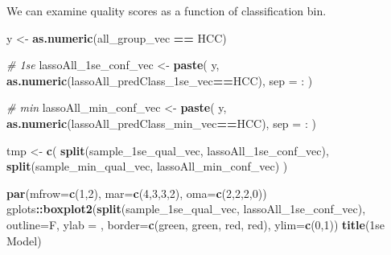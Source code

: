 \documentclass[
]{book}
\newenvironment{Shaded}{\begin{snugshade}}{\end{snugshade}}
\newcommand{\CommentTok}[1]{\textcolor[rgb]{0.56,0.35,0.01}{\textit{#1}}}
\newcommand{\DataTypeTok}[1]{\textcolor[rgb]{0.13,0.29,0.53}{#1}}
\newcommand{\DecValTok}[1]{\textcolor[rgb]{0.00,0.00,0.81}{#1}}
\newcommand{\KeywordTok}[1]{\textcolor[rgb]{0.13,0.29,0.53}{\textbf{#1}}}
\newcommand{\NormalTok}[1]{#1}
\newcommand{\OperatorTok}[1]{\textcolor[rgb]{0.81,0.36,0.00}{\textbf{#1}}}
\newcommand{\StringTok}[1]{\textcolor[rgb]{0.31,0.60,0.02}{#1}}
\begin{document}
We can examine quality scores as a function of classification bin.

\begin{Shaded}
\begin{Highlighting}[]
\NormalTok{y <{-}}\StringTok{ }\KeywordTok{as.numeric}\NormalTok{(all\_group\_vec }\OperatorTok{==}\StringTok{ \textquotesingle{}HCC\textquotesingle{}}\NormalTok{)}

\CommentTok{\# 1se}
\NormalTok{lassoAll\_1se\_conf\_vec <{-}}\StringTok{ }\KeywordTok{paste}\NormalTok{(}
\NormalTok{ y, }
 \KeywordTok{as.numeric}\NormalTok{(lassoAll\_predClass\_1se\_vec}\OperatorTok{==}\StringTok{\textquotesingle{}HCC\textquotesingle{}}\NormalTok{),}
 \DataTypeTok{sep =} \StringTok{\textquotesingle{}:\textquotesingle{}}
\NormalTok{)}

\CommentTok{\# min}
\NormalTok{lassoAll\_min\_conf\_vec <{-}}\StringTok{ }\KeywordTok{paste}\NormalTok{(}
\NormalTok{ y, }
 \KeywordTok{as.numeric}\NormalTok{(lassoAll\_predClass\_min\_vec}\OperatorTok{==}\StringTok{\textquotesingle{}HCC\textquotesingle{}}\NormalTok{),}
 \DataTypeTok{sep =} \StringTok{\textquotesingle{}:\textquotesingle{}}
\NormalTok{)}


\NormalTok{tmp <{-}}\StringTok{ }\KeywordTok{c}\NormalTok{(}
 \KeywordTok{split}\NormalTok{(sample\_1se\_qual\_vec, lassoAll\_1se\_conf\_vec), }
 \KeywordTok{split}\NormalTok{(sample\_min\_qual\_vec, lassoAll\_min\_conf\_vec)}
\NormalTok{)}

\KeywordTok{par}\NormalTok{(}\DataTypeTok{mfrow=}\KeywordTok{c}\NormalTok{(}\DecValTok{1}\NormalTok{,}\DecValTok{2}\NormalTok{), }\DataTypeTok{mar=}\KeywordTok{c}\NormalTok{(}\DecValTok{4}\NormalTok{,}\DecValTok{3}\NormalTok{,}\DecValTok{3}\NormalTok{,}\DecValTok{2}\NormalTok{), }\DataTypeTok{oma=}\KeywordTok{c}\NormalTok{(}\DecValTok{2}\NormalTok{,}\DecValTok{2}\NormalTok{,}\DecValTok{2}\NormalTok{,}\DecValTok{0}\NormalTok{))}
\NormalTok{gplots}\OperatorTok{::}\KeywordTok{boxplot2}\NormalTok{(}\KeywordTok{split}\NormalTok{(sample\_1se\_qual\_vec, lassoAll\_1se\_conf\_vec), }
  \DataTypeTok{outline=}\NormalTok{F, }\DataTypeTok{ylab =} \StringTok{\textquotesingle{}\textquotesingle{}}\NormalTok{, }
  \DataTypeTok{border=}\KeywordTok{c}\NormalTok{(}\StringTok{\textquotesingle{}green\textquotesingle{}}\NormalTok{, }\StringTok{\textquotesingle{}green\textquotesingle{}}\NormalTok{, }\StringTok{\textquotesingle{}red\textquotesingle{}}\NormalTok{, }\StringTok{\textquotesingle{}red\textquotesingle{}}\NormalTok{),}
  \DataTypeTok{ylim=}\KeywordTok{c}\NormalTok{(}\DecValTok{0}\NormalTok{,}\DecValTok{1}\NormalTok{))}
\KeywordTok{title}\NormalTok{(}\StringTok{\textquotesingle{}1se Model\textquotesingle{}}\NormalTok{)}


\end{Highlighting}
\end{Shaded}
\end{document}
